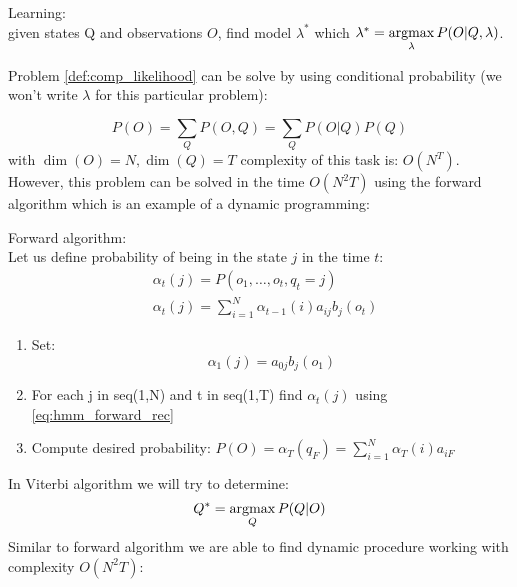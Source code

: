 \begin{definition} Learning: \\
	given states Q and observations $O$, find model $\lambda^*$ which $\lambda^*=\operatorname*{argmax}\limits_\lambda P(O|Q,\lambda)$.	
\end{definition}

Problem \ref{def:comp_likelihood} can be solve by using conditional probability (we won't write $\lambda$ for this particular problem):


\begin{equation}
	P(O)=\sum\limits_Q P(O,Q) = \sum\limits_Q P(O|Q)P(Q)
\end{equation}
with $\dim(O)=N, \dim(Q)=T$ complexity of this task is: $O(N^T)$. However, this problem can be solved in the time $O(N^2 T)$ using the forward algorithm which is an example of a dynamic programming:


\begin{algorithm} Forward algorithm: \\
	\label{arg:forward}
	Let us define probability of being in the state $j$ in the time $t$:
	\begin{align}
		&\alpha_t(j)=P(o_1,\ldots,o_t,q_t=j) \\
		\label{eq:hmm_forward_rec}
		&\alpha_t(j)=\sum\limits_{i=1}^{N} \alpha_{t-1}(i)a_{ij}b_j(o_t)
	\end{align}

	\begin{enumerate}
		\item Set:
			\begin{equation}
				\alpha_1(j)= a_{0j}b_j(o_1)
			\end{equation}
		\item For each j in seq(1,N) and t in seq(1,T) find $\alpha_t(j)$ using \eqref{eq:hmm_forward_rec} 
		\item Compute desired probability: $P(O) = \alpha_{T}(q_F)=\sum\limits^{N}_{i=1}\alpha_T(i)a_{iF}$

	\end{enumerate}
\end{algorithm}

In Viterbi algorithm we will try to determine:
\begin{equation}
	Q^*=\operatorname*{argmax}\limits_{Q} P(Q|O)
\end{equation}
Similar to forward algorithm we are able to find dynamic procedure working with complexity $O(N^2 T)$:

